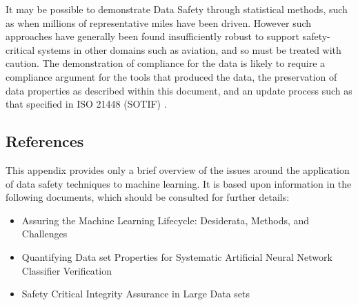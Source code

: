 It may be possible to demonstrate Data Safety through statistical methods,
such as when millions of representative miles have been driven.
However such approaches have generally been found insufficiently robust to support safety-critical systems in other domains
such as aviation, and so must be treated with caution.
The demonstration of compliance for the data is likely to require a compliance argument for the tools that produced the data,
the preservation of data properties as described within this document, and an update process such as that specified in ISO 21448 (SOTIF)
\cite{citation:ISO21448}.

\subsection{References}
This appendix provides only a brief overview of the issues around the application of data safety techniques to machine learning. It is based upon information in the following documents, which should be consulted for further details:
\begin{itemize}
\item Assuring the Machine Learning Lifecycle: Desiderata, Methods, and Challenges \cite{citation:Ashmore2019}
\item Quantifying Data set Properties for Systematic Artificial Neural Network Classifier Verification \cite{citation:Hond2020}
\item Safety Critical Integrity Assurance in Large Data sets \cite{citation:Sutherland2020}
\end{itemize}

